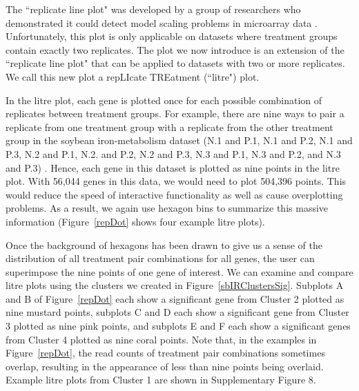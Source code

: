 \documentclass{bioinfo}
\begin{document}
The ``replicate line plot" was developed by a group of researchers who demonstrated it could detect model scaling problems in microarray data \citep{Cook}. Unfortunately, this plot is only applicable on datasets where treatment groups contain exactly two replicates. The plot we now introduce is an extension of the ``replicate line plot" that can be applied to datasets with two or more replicates. We call this new plot a repLIcate TREatment (``litre") plot.

In the litre plot, each gene is plotted once for each possible combination of replicates between treatment groups. For example, there are nine ways to pair a replicate from one treatment group with a replicate from the other treatment group in the soybean iron-metabolism dataset (N.1 and P.1, N.1 and P.2, N.1 and P.3, N.2 and P.1, N.2. and P.2, N.2 and P.3, N.3 and P.1, N.3 and P.2, and N.3 and P.3) \citep{Lauter16}. Hence, each gene in this dataset is plotted as nine points in the litre plot. With 56,044 genes in this data, we would need to plot 504,396 points. This would reduce the speed of interactive functionality as well as cause overplotting problems. As a result, we again use hexagon bins to summarize this massive information (Figure~\ref{repDot} shows four example litre plots).

Once the background of hexagons has been drawn to give us a sense of the distribution of all treatment pair combinations for all genes, the user can superimpose the nine points of one gene of interest. We can examine and compare litre plots using the clusters we created in Figure~\ref{sbIRClustersSig}. Subplots A and B of Figure~\ref{repDot} each show a significant gene from Cluster 2 plotted as nine mustard points, subplots C and D each show a significant gene from Cluster 3 plotted as nine pink points, and subplots E and F each show a significant genes from Cluster 4 plotted as nine coral points. Note that, in the examples in Figure~\ref{repDot}, the read counts of treatment pair combinations sometimes overlap, resulting in the appearance of less than nine points being overlaid. Example litre plots from Cluster 1 are shown in Supplementary Figure 8.
\end{document}
